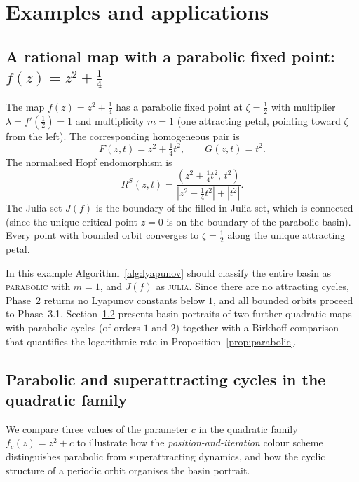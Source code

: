 \documentclass[12pt]{article}
\theoremstyle{definition}
\newcommand{\RS}{R^S}
\begin{document}
\section{Examples and applications}
\label{sec:examples}

\subsection{A rational map with a parabolic fixed point: $f(z) = z^2 + \tfrac{1}{4}$}

The map $f(z) = z^2 + \frac{1}{4}$ has a parabolic fixed point at
$\zeta = \frac{1}{2}$ with multiplier $\lambda = f'(\frac{1}{2}) = 1$
and multiplicity $m=1$ (one attracting petal, pointing toward $\zeta$
from the left).  The corresponding homogeneous pair is
\[
  F(z,t) = z^2 + \tfrac{1}{4}t^2, \qquad G(z,t) = t^2.
\]
The normalised Hopf endomorphism is
\[
  \RS(z,t) = \frac{(z^2 + \tfrac{1}{4}t^2,\, t^2)}{|z^2 +
  \tfrac{1}{4}t^2| + |t^2|}.
\]
The Julia set $J(f)$ is the boundary of the filled-in Julia set, which is
connected (since the unique critical point $z=0$ is on the boundary of
the parabolic basin).  Every point with bounded orbit converges to
$\zeta = \frac{1}{2}$ along the unique attracting petal.

In this example Algorithm~\ref{alg:lyapunov} should classify the entire
basin as \textsc{parabolic} with $m = 1$, and $J(f)$ as \textsc{julia}.
Since there are no attracting cycles, Phase~2 returns no Lyapunov
constants below $1$, and all bounded orbits proceed to Phase~3.1.
Section~\ref{sec:examples:quadratic_cycles} presents basin portraits of
two further quadratic maps with parabolic cycles (of orders $1$ and $2$)
together with a Birkhoff comparison that quantifies the logarithmic rate
in Proposition~\ref{prop:parabolic}.

\subsection{Parabolic and superattracting cycles in the quadratic family}
\label{sec:examples:quadratic_cycles}

We compare three values of the parameter $c$ in the quadratic family
$f_c(z)=z^2+c$ to illustrate how the \emph{position-and-iteration}
colour scheme distinguishes parabolic from superattracting dynamics, and
how the cyclic structure of a periodic orbit organises the basin portrait.
\end{document}
